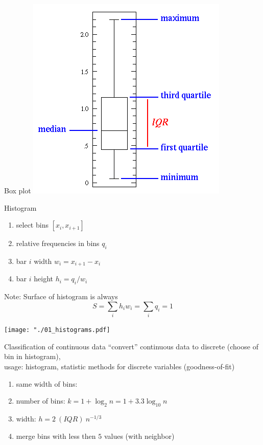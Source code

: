 \documentclass[smaller, hyperref={colorlinks=true}]{beamer}
\def\xskip{{\vspace{2ex}}}
\begin{document}
\begin{frame}{Box plot}
\includegraphics[scale=0.5]{01_simple_box_defs.png} 
\end{frame}


\begin{frame}[fragile]{Histogram}
 \begin{enumerate}
  \item select bins $[x_i, x_{i+1}]$
  \item relative frequencies in bins $q_i$
  \item bar $i$ width $w_i = x_{i+1} - x_i$
  \item bar $i$ height $h_i = q_i / w_i$
 \end{enumerate}
 
 \xskip

 Note: Surface of histogram is always
 \[
   S = \sum_i h_i w_i = \sum_i q_i = 1
 \]

\end{frame}

\begin{frame}
\noindent
\hspace{-3ex}\texttt{[image: "./01\_histograms.pdf]}  
\end{frame}


\begin{frame}{Classification of continuous data}
``convert'' continuous data to discrete (choose of bin in histogram),\\
usage: histogram, statistic methods for discrete variables (goodness-of-fit)
\begin{enumerate}
\item same width of bins: 
\item number of bins:  $k = 1+\log_2 n=1+3.3 \log_10 n$
\item width: $h = 2\ (IQR)\ n^{-1/3}$
\item merge bins with less then $5$ values (with neighbor)
\end{enumerate}
\end{frame}
\end{document}
